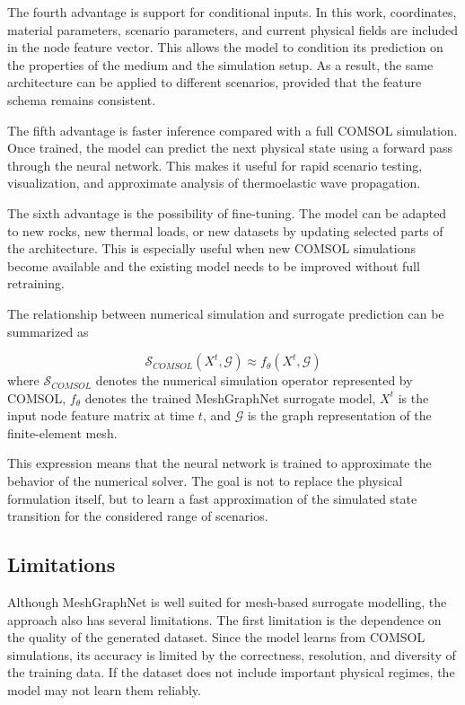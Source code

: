 The fourth advantage is support for conditional inputs. In this work, coordinates, material parameters, scenario parameters, and current physical fields are included in the node feature vector. This allows the model to condition its prediction on the properties of the medium and the simulation setup. As a result, the same architecture can be applied to different scenarios, provided that the feature schema remains consistent.

The fifth advantage is faster inference compared with a full COMSOL simulation. Once trained, the model can predict the next physical state using a forward pass through the neural network. This makes it useful for rapid scenario testing, visualization, and approximate analysis of thermoelastic wave propagation.

The sixth advantage is the possibility of fine-tuning. The model can be adapted to new rocks, new thermal loads, or new datasets by updating selected parts of the architecture. This is especially useful when new COMSOL simulations become available and the existing model needs to be improved without full retraining.

The relationship between numerical simulation and surrogate prediction can be summarized as

\begin{equation}
\mathcal{S}_{COMSOL}
\left(
X^{t},
\mathcal{G}
\right)
\approx
f_{\theta}
\left(
X^{t},
\mathcal{G}
\right)
\end{equation}
where \(\mathcal{S}_{COMSOL}\) denotes the numerical simulation operator represented by COMSOL, \(f_{\theta}\) denotes the trained MeshGraphNet surrogate model, \(X^{t}\) is the input node feature matrix at time \(t\), and \(\mathcal{G}\) is the graph representation of the finite-element mesh.

This expression means that the neural network is trained to approximate the behavior of the numerical solver. The goal is not to replace the physical formulation itself, but to learn a fast approximation of the simulated state transition for the considered range of scenarios.

\subsection{Limitations}

Although MeshGraphNet is well suited for mesh-based surrogate modelling, the approach also has several limitations. The first limitation is the dependence on the quality of the generated dataset. Since the model learns from COMSOL simulations, its accuracy is limited by the correctness, resolution, and diversity of the training data. If the dataset does not include important physical regimes, the model may not learn them reliably.

